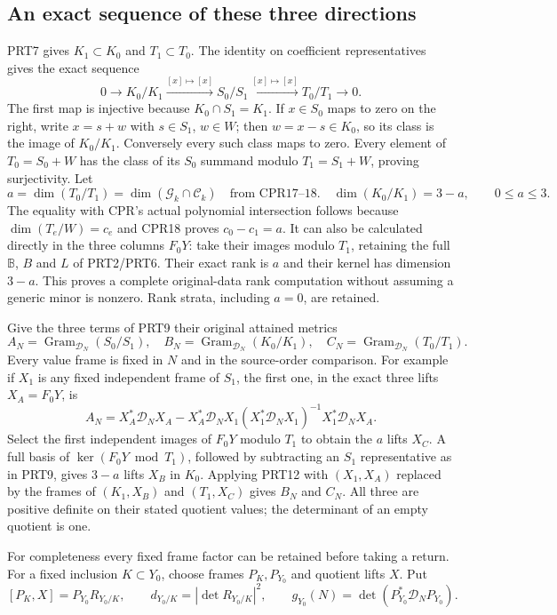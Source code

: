 \documentclass[11pt,a4paper]{article}
\begin{document}
\subsection{An exact sequence of these three directions}

PRT7 gives $K_1\subset K_0$ and $T_1\subset T_0$. The identity on
coefficient representatives gives the exact sequence
\[
 0\longrightarrow K_0/K_1\xrightarrow{[x]\mapsto[x]}
 S_0/S_1\xrightarrow{[x]\mapsto[x]}T_0/T_1\longrightarrow0.
 \tag{PRT9}
\]
The first map is injective because $K_0\cap S_1=K_1$.
If $x\in S_0$ maps to zero on the right, write $x=s+w$ with
$s\in S_1$, $w\in W$; then $w=x-s\in K_0$, so its class is the
image of $K_0/K_1$. Conversely every such class maps to zero. Every
element of $T_0=S_0+W$ has the class of its $S_0$ summand modulo
$T_1=S_1+W$, proving surjectivity.
Let
\[
 a=\dim(T_0/T_1)=\dim(\mathcal G_k\cap\mathcal C_k)
                    \quad\text{from CPR17--18}.
 \quad
 \dim(K_0/K_1)=3-a,\qquad0\le a\le3.
 \tag{PRT10}
\]
The equality with CPR's actual polynomial intersection follows because
$\dim(T_e/W)=c_e$ and CPR18 proves $c_0-c_1=a$. It can also be
calculated directly in the three columns $F_0Y$: take their images
modulo $T_1$, retaining the full $\mathbb B$, $B$ and $L$ of
PRT2/PRT6. Their exact rank is $a$ and their kernel has dimension
$3-a$. This proves a complete original-data rank computation without
assuming a generic minor is nonzero. Rank strata, including $a=0$,
are retained.

Give the three terms of PRT9 their original attained metrics
\[
 A_N=\operatorname{Gram}_{\mathcal D_N}(S_0/S_1),\quad
 B_N=\operatorname{Gram}_{\mathcal D_N}(K_0/K_1),\quad
 C_N=\operatorname{Gram}_{\mathcal D_N}(T_0/T_1).
 \tag{PRT11}
\]
Every value frame is fixed in $N$ and in the source-order comparison.
For example if $X_1$ is any fixed independent frame of $S_1$, the first
one, in the exact three lifts $X_A=F_0Y$, is
\[
 A_N=X_A^*\mathcal D_NX_A-X_A^*\mathcal D_NX_1
 (X_1^*\mathcal D_NX_1)^{-1}X_1^*\mathcal D_NX_A.
 \tag{PRT12}
\]
Select the first independent images of $F_0Y$ modulo $T_1$ to obtain
the $a$ lifts $X_C$. A full basis of $\ker(F_0Y\bmod T_1)$, followed
by subtracting an $S_1$ representative as in PRT9, gives $3-a$
lifts $X_B$ in $K_0$. Applying PRT12 with $(X_1,X_A)$ replaced by
the frames of $(K_1,X_B)$ and $(T_1,X_C)$ gives $B_N$ and $C_N$.
All three are positive definite on their stated quotient values;
the determinant of an empty quotient is one.

For completeness every fixed frame factor can be retained before
taking a return. For a fixed inclusion $K\subset Y_0$, choose frames
$P_K,P_{Y_0}$ and quotient lifts $X$. Put
\[
 [P_K,X]=P_{Y_0}R_{Y_0/K},\qquad
 d_{Y_0/K}=|\det R_{Y_0/K}|^2,\qquad
 g_{Y_0}(N)=\det(P_{Y_0}^*\mathcal D_NP_{Y_0}).
 \tag{PRT13}
\]
\end{document}
